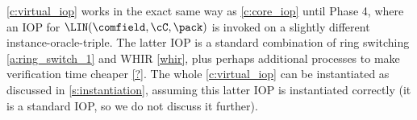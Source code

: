 \begin{remark}
    \cref{c:virtual_iop} works in the exact same way as \cref{c:core_iop} until Phase 4, where an IOP for $\LIN(\comfield,\cC, \pack)$ is invoked on a slightly different instance-oracle-triple. The latter IOP is a standard combination of ring switching \cref{a:ring_switch_1} and WHIR \cref{whir}, plus perhaps additional processes to make verification time cheaper \cref{?}. The whole \cref{c:virtual_iop} can be instantiated as discussed in \cref{s:instantiation}, assuming this latter IOP is instantiated correctly (it is a standard IOP, so we do not discuss it further).  
\end{remark}





